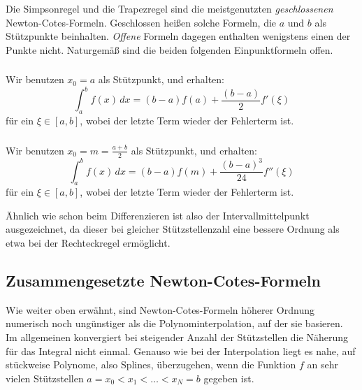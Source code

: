 Die Simpsonregel und die Trapezregel sind die meistgenutzten
\emph{geschlossenen} Newton-Cotes-Formeln. Geschlossen heißen solche
Formeln, die $a$ und $b$ als Stützpunkte beinhalten. \emph{Offene}
Formeln dagegen enthalten wenigstens einen der Punkte
nicht. Naturgemäß sind die beiden folgenden Einpunktformeln offen.

\subsubsection{}
\begin{minipage}[t]{0.74\linewidth}
  Wir benutzen $x_0=a$ als Stützpunkt, und erhalten:
  \begin{equation}
    \int_a^b f(x)\, dx = (b-a) f(a) +
    \frac{(b-a)}{2} f'(\xi)
  \end{equation}
  für ein $\xi\in[a,b]$, wobei der letzte Term wieder der Fehlerterm ist.
\end{minipage}

\subsubsection{}
\begin{minipage}[t]{0.74\linewidth}
  Wir benutzen $x_0=m=\frac{a+b}{2}$ als Stützpunkt, und erhalten:
  \begin{equation}
    \int_a^b f(x)\, dx = (b-a) f(m) +
    \frac{(b-a)^3}{24} f''(\xi)
  \end{equation}
  für ein $\xi\in[a,b]$, wobei der letzte Term wieder der Fehlerterm
  ist.
\end{minipage}

Ähnlich wie schon beim Differenzieren ist also der
Intervallmittelpunkt ausgezeichnet, da dieser bei gleicher
Stützstellenzahl eine bessere Ordnung als etwa bei der Rechteckregel
ermöglicht.

\subsection{Zusammengesetzte Newton-Cotes-Formeln}

Wie weiter oben erwähnt, sind Newton-Cotes-Formeln höherer Ordnung
numerisch noch ungünstiger als die Polynominterpolation, auf der sie
basieren. Im allgemeinen konvergiert bei steigender Anzahl der
Stützstellen die Näherung für das Integral nicht einmal. Genauso wie
bei der Interpolation liegt es nahe, auf stückweise Polynome, also
Splines, überzugehen, wenn die Funktion $f$ an sehr vielen
Stützstellen $a=x_0< x_1 < \ldots < x_{N} = b$ gegeben ist.

